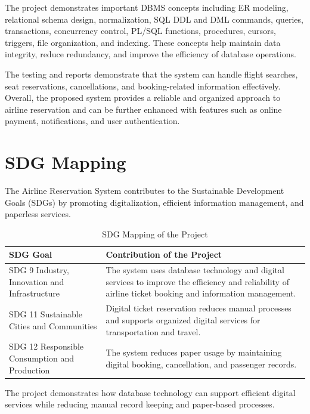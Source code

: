 \documentclass[12pt,a4paper]{article}
\begin{document}
The project demonstrates important DBMS concepts including ER modeling, relational schema design,
normalization, SQL DDL and DML commands, queries, transactions, concurrency control, PL/SQL functions,
procedures, cursors, triggers, file organization, and indexing. These concepts help maintain data integrity,
reduce redundancy, and improve the efficiency of database operations.

The testing and reports demonstrate that the system can handle flight searches, seat reservations,
cancellations, and booking-related information effectively. Overall, the proposed system provides a
reliable and organized approach to airline reservation and can be further enhanced with features such as
online payment, notifications, and user authentication.

\section{SDG Mapping}
The Airline Reservation System contributes to the Sustainable Development Goals (SDGs) by promoting
digitalization, efficient information management, and paperless services.
\begin{table}[H]
\centering\small
\begin{tabularx}{\textwidth}{l X}
\toprule
\textbf{SDG Goal} & \textbf{Contribution of the Project}\\
\midrule
SDG 9 Industry, Innovation and Infrastructure &
The system uses database technology and digital services to improve the efficiency and reliability of
airline ticket booking and information management.\\
SDG 11 Sustainable Cities and Communities &
Digital ticket reservation reduces manual processes and supports organized digital services for
transportation and travel.\\
SDG 12 Responsible Consumption and Production &
The system reduces paper usage by maintaining digital booking, cancellation, and passenger records.\\
\bottomrule
\end{tabularx}
\caption{SDG Mapping of the Project}
\end{table}
The project demonstrates how database technology can support efficient digital services while reducing
manual record keeping and paper-based processes.
\end{document}
